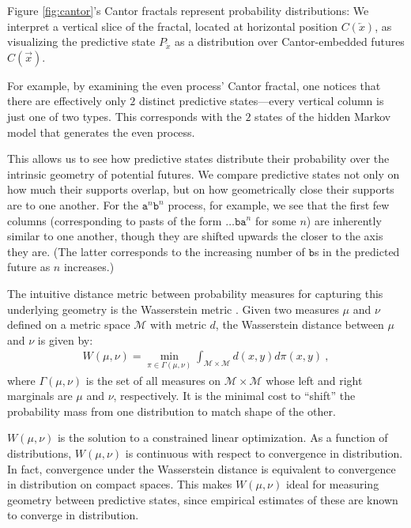 \documentclass[sigconf, anonymous, review]{acmart}
\begin{document}
Figure \ref{fig:cantor}'s Cantor fractals represent probability distributions:
We interpret a vertical slice of the fractal, located at horizontal position
$C(\overleftarrow{x})$, as visualizing the predictive state
$P_{\overleftarrow{x}}$ as a distribution over Cantor-embedded futures
$C(\overrightarrow{x})$.

For example, by examining the even process' Cantor fractal, one notices that
there are effectively only $2$ distinct predictive states---every vertical
column is just one of two types. This corresponds with the $2$ states of the
hidden Markov model that generates the even process.

This allows us to see how predictive states distribute their probability over
the intrinsic geometry of potential futures. We compare predictive states not
only on how much their supports overlap, but on how geometrically close their
supports are to one another. For the $\mathtt{a}^n \mathtt{b}^n$ process, for
example, we see that the first few columns (corresponding to pasts of the form
$\dots \mathtt{b a}^n$ for some $n$) are inherently similar to one another,
though they are shifted upwards the closer to the axis they are. (The latter
corresponds to the increasing number of $\mathtt{b}$s in the predicted future
as $n$ increases.)

The intuitive distance metric between probability measures for capturing this
underlying geometry is the Wasserstein metric \cite{Pane19a}. Given two measures
$\mu$ and $\nu$ defined on a metric space $\mathcal{M}$ with metric $d$, the
Wasserstein distance between $\mu$ and $\nu$ is given by:
\begin{align*}
  W(\mu,\nu) = \min_{\pi\in \Gamma(\mu,\nu)}
   \int_{\mathcal{M}\times\mathcal{M}} 
   d(x,y) d\pi(x,y)
   ~,
\end{align*}
where $\Gamma(\mu,\nu)$ is the set of all measures on $\mathcal{M} \times
\mathcal{M}$ whose left and right marginals are $\mu$ and $\nu$, respectively.
It is the minimal cost to ``shift'' the probability mass from one distribution
to match shape of the other. 

$W(\mu,\nu)$ is the solution to a constrained linear optimization. As a
function of distributions, $W(\mu,\nu)$ is continuous with respect to
convergence in distribution. In fact, convergence under the Wasserstein
distance is equivalent to convergence in distribution on compact spaces. This
makes $W(\mu,\nu)$ ideal for measuring geometry between predictive states,
since empirical estimates of these are known to converge in distribution.
\end{document}
